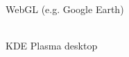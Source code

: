 \documentclass[calcdimensions,landscape,letterpaper]{powersem}
\begin{document}
\begin{slide}
\begin{center}
\begin{minipage}[c]{.47\textwidth}
\begin{center}
        \\
        WebGL (e.g. Google Earth)
      \end{center}
    \end{minipage}
    \begin{minipage}[c]{.47\textwidth}
      \begin{center}
        \\
        KDE Plasma desktop
      \end{center}
    \end{minipage}
  \end{center}
\end{slide}
\end{document}
